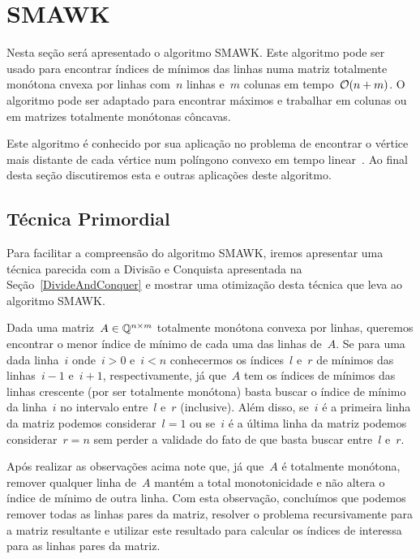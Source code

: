 \section{SMAWK}
\label{SMAWK}


Nesta seção será apresentado o algoritmo SMAWK. Este algoritmo pode ser usado para encontrar índices de mínimos das linhas numa matriz totalmente monótona cnvexa por linhas com~$n$ linhas e~$m$ colunas em tempo~$\mathcal{O}(n+m)$. O algoritmo pode ser adaptado para encontrar máximos e trabalhar em colunas ou em matrizes totalmente monótonas côncavas.  

Este algoritmo é conhecido por sua aplicação no problema de encontrar o vértice mais distante de cada vértice num políngono convexo em tempo linear~\cite{Aggarwal:1987}. Ao final desta seção discutiremos esta e outras aplicações deste algoritmo.

\subsection{Técnica Primordial}
Para facilitar a compreensão do algoritmo SMAWK, iremos apresentar uma técnica parecida com a Divisão e Conquista apresentada na Seção~\ref{DivideAndConquer} e mostrar uma otimização desta técnica que leva ao algoritmo SMAWK.

Dada uma matriz~$A \in \mathbb{Q}^{n \times m}$ totalmente monótona convexa por linhas, queremos encontrar o menor índice de mínimo de cada uma das linhas de~$A$. Se para uma dada linha~$i$ onde~$i > 0$ e~$i < n$ conhecermos os índices~$l$ e~$r$ de mínimos das linhas~$i-1$ e~$i+1$, respectivamente, já que~$A$ tem os índices de mínimos das linhas crescente (por ser totalmente monótona) basta buscar o índice de mínimo da linha~$i$ no intervalo entre~$l$ e~$r$ (inclusive). Além disso, se~$i$ é a primeira linha da matriz podemos considerar~$l = 1$ ou se~$i$ é a última linha da matriz podemos considerar~$r = n$ sem perder a validade do fato de que basta buscar entre~$l$ e~$r$.  

Após realizar as observações acima note que, já que~$A$ é totalmente monótona, remover qualquer linha de~$A$ mantém a total monotonicidade e não altera o índice de mínimo de outra linha. Com esta observação, concluímos que podemos remover todas as linhas pares da matriz, resolver o problema recursivamente para a matriz resultante e utilizar este resultado para calcular os índices de interessa para as linhas pares da matriz.  

